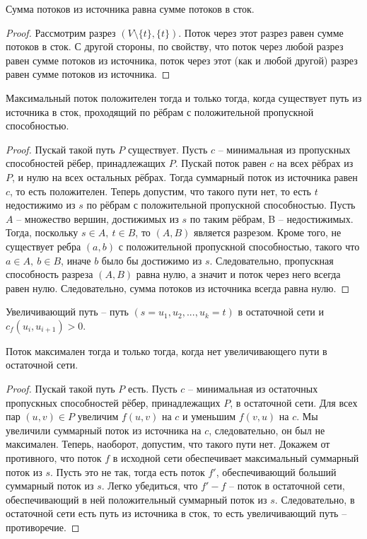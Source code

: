 	\begin{Lm}
		Сумма потоков из источника равна сумме потоков в сток.
	\end{Lm}

	\begin{proof}
		Рассмотрим разрез  ${\displaystyle (V\setminus \{t\},\{t\})}$. Поток через этот разрез равен сумме потоков в сток. С другой стороны, по свойству, 
		что поток через любой разрез равен сумме потоков из источника, поток через этот (как и любой другой) разрез равен сумме потоков из источника.
	\end{proof}

	\begin{Lm}
		Максимальный поток положителен тогда и только тогда, когда существует путь из источника в сток, проходящий по рёбрам с положительной пропускной способностью.
	\end{Lm}

	\begin{proof}
		Пускай такой путь $P$ существует. Пусть $c$ -- минимальная из пропускных способностей рёбер, принадлежащих $P$.
		Пускай поток равен $c$ на всех рёбрах из $P$, и нулю на всех остальных рёбрах. Тогда суммарный поток из источника равен $c$, то есть положителен. 
		Теперь допустим, что такого пути нет, то есть $t$ недостижимо из $s$ по рёбрам с положительной пропускной способностью. 
		Пусть $A$ -- множество вершин, достижимых из $s$ по таким рёбрам, B -- недостижимых. 
		Тогда, поскольку $s\in A, \ t\in B$, то $(A,B)$ является разрезом. 
		Кроме того, не существует ребра $(a, b)$ с положительной пропускной способностью, такого что $a\in A, \ b\in B$, 
		иначе $b$ было бы достижимо из $s$. Следовательно, пропускная способность разреза $(A,B)$ равна нулю, а значит и поток через него всегда равен нулю. 
		Следовательно, сумма потоков из источника всегда равна нулю. 
	\end{proof}

	\begin{Def}
		Увеличивающий путь -- путь $(s = u_1, u_2, ..., u_k = t)$ в остаточной сети и $c_f(u_i, u_{i+1}) > 0$. 
	\end{Def}

	\begin{Thm}
		Поток максимален тогда и только тогда, когда нет увеличивающего пути в остаточной сети.
	\end{Thm}

	\begin{proof}
		Пускай такой путь $P$ есть. Пусть $c$ -- минимальная из остаточных пропускных способностей рёбер, принадлежащих $P$, в остаточной сети. 
		Для всех пар $(u,v)\in P$ увеличим $f(u, v)$ на $c$ и уменьшим $f(v, u)$ на $c$. Мы увеличили суммарный поток из источника на $c$, следовательно, он был не максимален. 
		Теперь, наоборот, допустим, что такого пути нет. Докажем от противного, что поток $f$ в исходной сети обеспечивает максимальный суммарный поток из $s$. 
		Пусть это не так, тогда есть поток $f'$, обеспечивающий больший суммарный поток из $s$. Легко убедиться, что $f'-f$ -- поток в остаточной сети, 
		обеспечивающий в ней положительный суммарный поток из $s$. Следовательно, в остаточной сети есть путь из источника в сток, то есть увеличивающий путь -- противоречие. 
	\end{proof}

